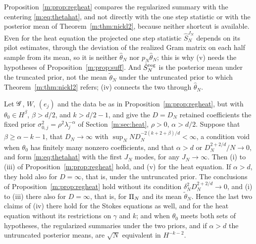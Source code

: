 Proposition~\ref{m:prop:regheat} compares the regularized summary with the centering \eqref{m:eq:thetahat}, and not directly with the one step statistic or with the posterior mean of Theorem~\ref{m:thm:nickl2}, because neither shortcut is available. Even for the heat equation the projected one step statistic $\hat S^{J_N}_N$ depends on its pilot estimates, through the deviation of the realized Gram matrix on each half sample from its mean, so it is neither $\hat\theta_N$ nor $p_N\hat\theta_N$; this is why (v) needs the hypotheses of Proposition~\ref{m:prop:suff}. And $\hat S^{\rm reg}_N$ is the posterior mean under the truncated prior, not the mean $\tilde\theta_N$ under the untruncated prior to which Theorem~\ref{m:thm:nickl2} refers; (iv) connects the two through $\hat\theta_N$.

\begin{proposition}\label{m:prop:regfixed}
Let $\mathscr{G}$, $W$, $(e_j)$ and the data be as in Proposition~\ref{m:prop:regheat}, but with $\theta_0\in H^\beta$, $\beta>d/2$, and $k>d/2-1$, and give the $D=D_N$ retained coefficients the fixed prior $\sigma^2_{0,j}=\rho^2\lambda_j^{-\alpha}$ of Section~\ref{m:sec:heat}, $\rho>0$, $\alpha>d/2$. Suppose that $\beta\ge\alpha-k-1$, that $D_N\to\infty$ with $\sup_NND_N^{-2(k+2+\beta)/d}<\infty$, a condition void when $\theta_0$ has finitely many nonzero coefficients, and that $\alpha>d$ or $D_N^{2+2/d}/N\to0$, and form \eqref{m:eq:thetahat} with the first $J_N$ modes, for any $J_N\to\infty$. Then (i) to (iii) of Proposition~\ref{m:prop:regheat} hold, and (v) for the heat equation. If $\alpha>d$, they hold also for $D=\infty$, that is, under the untruncated prior. The conclusions of Proposition~\ref{m:prop:regheat} hold without its condition $\delta_N^2D_N^{2+2/d}\to0$, and (i) to (iii) there also for $D=\infty$, that is, for $\Pi_N$ and its mean $\tilde\theta_N$. Hence the last two claims of (iv) there hold for the Stokes equations as well, and for the heat equation without its restrictions on $\gamma$ and $k$; and when $\theta_0$ meets both sets of hypotheses, the regularized summaries under the two priors, and if $\alpha>d$ the untruncated posterior means, are $\sqrt N$ equivalent in $H^{-k-2}$.
\end{proposition}

